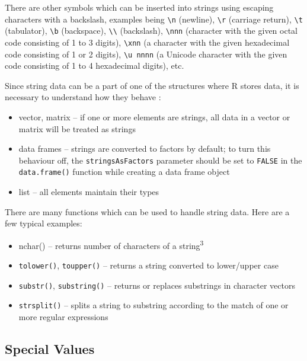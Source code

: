 There are other symbols which can be inserted into strings using escaping characters with a backslash, examples being 
\texttt{\textbackslash n} (newline), \texttt{\textbackslash r} (carriage return), \texttt{\textbackslash t} (tabulator), 
\texttt{\textbackslash b} (backspace), \texttt{\textbackslash\textbackslash} (backslash), 
\texttt{\textbackslash nnn} (character with the given octal code consisting of 1 to 3 digits), 
\texttt{\textbackslash xnn} (a character with the given hexadecimal code consisting of 1 or 2 digits), 
\texttt{\textbackslash u nnnn} (a Unicode character with the given code consisting of 1 to 4 hexadecimal digits), etc.

Since string data can be a part of one of the structures where R stores data, it
is necessary to understand how they behave \cite{ref237}:

\begin{itemize}
    \item vector, matrix – if one or more elements are strings, all data in a vector
or matrix will be treated as strings
    \item data frames – strings are converted to factors by default; to turn this behaviour off, the \texttt{stringsAsFactors} parameter should be set to \texttt{FALSE}
in the \texttt{data.frame()} function while creating a data frame object
    \item list – all elements maintain their types
\end{itemize}

There are many functions which can be used to handle string data. Here are
a few typical examples:

\begin{itemize}
    \item nchar() – returns number of characters of a string\textsuperscript{3}
    \item \texttt{tolower()}, \texttt{toupper()} – returns a string converted to lower/upper case

    \item \texttt{substr()}, \texttt{substring()} – returns or replaces substrings in character
vectors
    \item \texttt{strsplit()} – splits a string to substring according to the match of one
or more regular expressions
\end{itemize}

\subsection{Special Values}

